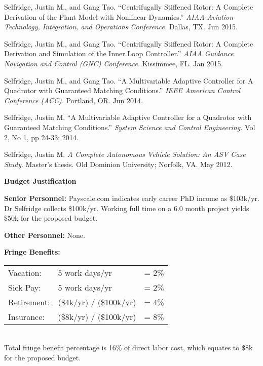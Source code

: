 \documentclass[11pt]{article}
\newcommand{\PubSpace}{\vspace{-0.12cm}}  %
\begin{document}
\PubSpace
Selfridge, Justin M., and Gang Tao.
``Centrifugally Stiffened Rotor: A Complete Derivation of the Plant Model with Nonlinear Dynamics.''
\emph{AIAA Aviation Technology, Integration, and Operations Conference.}
Dallas, TX.
Jun 2015.

\PubSpace
Selfridge, Justin M., and Gang Tao.
``Centrifugally Stiffened Rotor: A Complete Derivation and Simulation of the Inner Loop Controller.''
\emph{AIAA Guidance Navigation and Control (GNC) Conference.}
Kissimmee, FL.
Jan 2015.

\PubSpace
Selfridge, Justin M., and Gang Tao.
``A Multivariable Adaptive Controller for A Quadrotor with Guaranteed Matching Conditions.''
\emph{IEEE American Control Conference (ACC).}
Portland, OR.
Jun 2014.

\PubSpace
Selfridge, Justin M.
``A Multivariable Adaptive Controller for a Quadrotor with Guaranteed Matching Conditions.''
\emph{System Science and Control Engineering.}
Vol 2, No 1, pp 24-33; 2014.

\PubSpace
Selfridge, Justin M.
\emph{A Complete Autonomous Vehicle Solution: An ASV Case Study}.
Master's thesis.
Old Dominion University; Norfolk, VA.
May 2012.








\newpage
{\bf \Huge Budget Justification}


{\bf Senior Personnel:} Payscale.com indicates early career PhD income as \$103k/yr.  Dr Selfridge collects \$100k/yr.  Working full time on a 6.0 month project yields \$50k for the proposed budget.


{\bf Other Personnel:} None.


{\bf Fringe Benefits:} \\
\begin{tabular}{lll}
Vacation:     &  5 work days/yr         & = 2\%  \\
Sick Pay:     &  5 work days/yr         & = 2\%  \\
Retirement:   & (\$4k/yr) / (\$100k/yr) & = 4\%  \\
Insurance:    & (\$8k/yr) / (\$100k/yr) & = 8\%  \\
\end{tabular}  \\
Total fringe benefit percentage is 16\% of direct labor cost, which equates to \$8k for the proposed budget.
\end{document}
